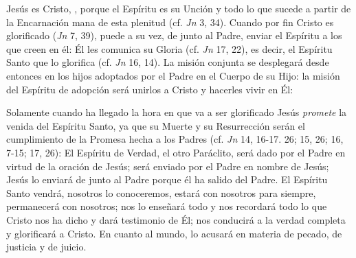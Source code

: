 
\begin{ccebody}
 Jesús es Cristo, , porque el Espíritu es su Unción y todo lo que sucede a partir de la Encarnación mana de esta plenitud (cf. \textit{Jn} 3, 34). Cuando por fin Cristo es glorificado (\textit{Jn} 7, 39), puede a su vez, de junto al Padre, enviar el Espíritu a los que creen en él: Él les comunica su Gloria (cf. \textit{Jn} 17, 22), es decir, el Espíritu Santo que lo glorifica (cf. \textit{Jn} 16, 14). La misión conjunta se desplegará desde entonces en los hijos adoptados por el Padre en el Cuerpo de su Hijo: la misión del Espíritu de adopción será unirlos a Cristo y hacerles vivir en Él:


 Solamente cuando ha llegado la hora en que va a ser glorificado Jesús \textit{promete} la venida del Espíritu Santo, ya que su Muerte y su Resurrección serán el cumplimiento de la Promesa hecha a los Padres (cf. \textit{Jn} 14, 16-17. 26; 15, 26; 16, 7-15; 17, 26): El Espíritu de Verdad, el otro Paráclito, será dado por el Padre en virtud de la oración de Jesús; será enviado por el Padre en nombre de Jesús; Jesús lo enviará de junto al Padre porque él ha salido del Padre. El Espíritu Santo vendrá, nosotros lo conoceremos, estará con nosotros para siempre, permanecerá con nosotros; nos lo enseñará todo y nos recordará todo lo que Cristo nos ha dicho y dará testimonio de Él; nos conducirá a la verdad completa y glorificará a Cristo. En cuanto al mundo, lo acusará en materia de pecado, de justicia y de juicio.
\end{ccebody}


